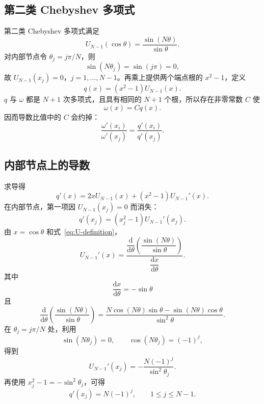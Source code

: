 \documentclass[11pt,a4paper]{ctexart}
\numberwithin{equation}{section}
\begin{document}
\subsection{第二类 Chebyshev 多项式}

第二类 Chebyshev 多项式满足
\begin{equation}
  U_{N-1}(\cos\theta)=\frac{\sin(N\theta)}{\sin\theta}.
  \label{eq:U-definition}
\end{equation}
对内部节点令 $\theta_j=j\pi/N$，则
\begin{equation}
  \sin(N\theta_j)=\sin(j\pi)=0,
\end{equation}
故 $U_{N-1}(x_j)=0$，$j=1,\ldots,N-1$。再乘上提供两个端点根的 $x^2-1$，定义
\begin{equation}
  q(x)=(x^2-1)U_{N-1}(x).
\end{equation}
$q$ 与 $\omega$ 都是 $N+1$ 次多项式，且具有相同的 $N+1$ 个根，所以存在非零常数 $C$ 使
\begin{equation}
  \omega(x)=Cq(x).
\end{equation}
因而导数比值中的 $C$ 会约掉：
\begin{equation}
  \frac{\omega'(x_i)}{\omega'(x_j)}
  =\frac{q'(x_i)}{q'(x_j)}.
\end{equation}

\subsection{内部节点上的导数}

求导得
\begin{equation}
  q'(x)=2xU_{N-1}(x)+(x^2-1)U_{N-1}'(x).
\end{equation}
在内部节点，第一项因 $U_{N-1}(x_j)=0$ 而消失：
\begin{equation}
  q'(x_j)=(x_j^2-1)U_{N-1}'(x_j).
\end{equation}
由 $x=\cos\theta$ 和式~\eqref{eq:U-definition}，
\begin{equation}
  U_{N-1}'(x)
  =\frac{\dfrac{\mathrm d}{\mathrm d\theta}
    \left(\dfrac{\sin(N\theta)}{\sin\theta}\right)}
   {\dfrac{\mathrm dx}{\mathrm d\theta}}.
\end{equation}
其中
\begin{equation}
  \frac{\mathrm dx}{\mathrm d\theta}=-\sin\theta
\end{equation}
且
\begin{equation}
  \frac{\mathrm d}{\mathrm d\theta}
  \left(\frac{\sin(N\theta)}{\sin\theta}\right)
  =\frac{N\cos(N\theta)\sin\theta-\sin(N\theta)\cos\theta}
  {\sin^2\theta}.
\end{equation}
在 $\theta_j=j\pi/N$ 处，利用
\begin{equation}
  \sin(N\theta_j)=0,
  \qquad \cos(N\theta_j)=(-1)^j,
\end{equation}
得到
\begin{equation}
  U_{N-1}'(x_j)=-\frac{N(-1)^j}{\sin^2\theta_j}.
\end{equation}
再使用 $x_j^2-1=-\sin^2\theta_j$，可得
\begin{equation}
  \boxed{q'(x_j)=N(-1)^j},
  \qquad 1\le j\le N-1.
  \label{eq:q-interior}
\end{equation}
\end{document}

